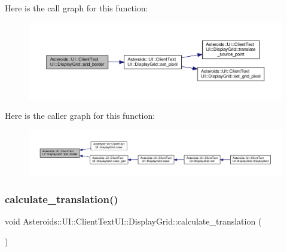 Here is the call graph for this function\+:\nopagebreak
\begin{figure}[H]
\begin{center}
\leavevmode
\includegraphics[width=350pt]{classAsteroids_1_1UI_1_1ClientTextUI_1_1DisplayGrid_a8c7048980c9b3443b5cfa20dd16c6935_cgraph}
\end{center}
\end{figure}
Here is the caller graph for this function\+:\nopagebreak
\begin{figure}[H]
\begin{center}
\leavevmode
\includegraphics[width=350pt]{classAsteroids_1_1UI_1_1ClientTextUI_1_1DisplayGrid_a8c7048980c9b3443b5cfa20dd16c6935_icgraph}
\end{center}
\end{figure}
\mbox{\label{classAsteroids_1_1UI_1_1ClientTextUI_1_1DisplayGrid_aba2b6b3d0cef0cff63f709207652cf44}} 
\subsubsection{\texorpdfstring{calculate\+\_\+translation()}{calculate\_translation()}}
{\footnotesize\ttfamily void Asteroids\+::\+U\+I\+::\+Client\+Text\+U\+I\+::\+Display\+Grid\+::calculate\+\_\+translation (\begin{DoxyParamCaption}{ }\end{DoxyParamCaption})\hspace{0.3cm}{\ttfamily [private]}}




